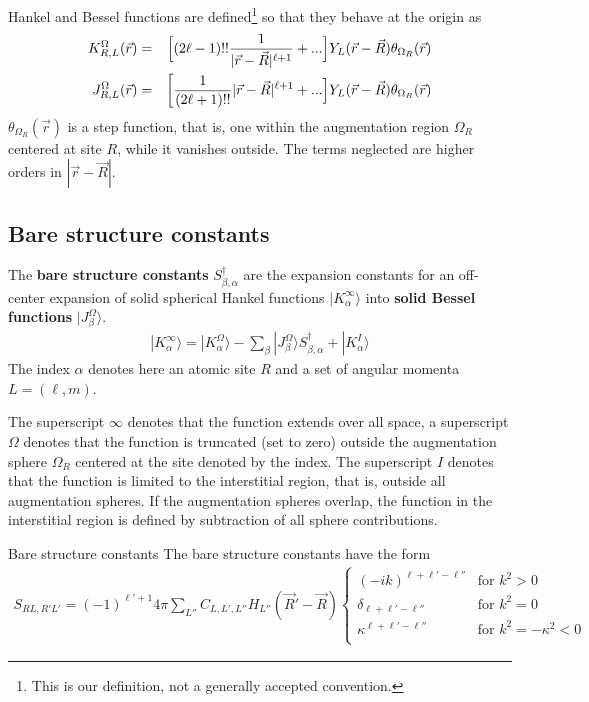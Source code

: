\documentclass[11pt,a4paper]{report}
\begin{document}
Hankel and Bessel functions are defined\footnote{This is our
  definition, not a generally accepted convention.} so that they
behave at the origin as
\begin{eqnarray}
K^\Omega_{R,L}(\vec{r})&=&
\Bigl[(2\ell-1)!! \frac{1}{|\vec{r}-\vec{R}|^{\ell+1}} 
+...\Bigr]
Y_L(\vec{r}-\vec{R})\theta_{\Omega_R}(\vec{r})
\\
J^\Omega_{R,L}(\vec{r})&=&
\biggl[\frac{1}{(2\ell+1)!!} |\vec{r}-\vec{R}|^{\ell+1} 
+...\Bigr]Y_L(\vec{r}-\vec{R})\theta_{\Omega_R}(\vec{r})
\end{eqnarray}
$\theta_{\Omega_R}(\vec{r})$ is a step function, that is, one within the
augmentation region $\Omega_R$ centered at site $R$, while it vanishes
outside. The terms neglected are higher orders in $|\vec{r}-\vec{R}|$.

\subsection{Bare structure constants}
The \textbf{bare structure constants}
$S^\dagger_{\beta,\alpha}$ are the expansion constants for an
off-center expansion of solid spherical Hankel functions $|K_{\alpha}^\infty\rangle$ into \textbf{solid Bessel
  functions} $|J^\Omega_{\beta}\rangle$.
\begin{eqnarray}
|K_{\alpha}^\infty\rangle=|K^\Omega_{\alpha}\rangle
-\sum_{\beta}|J^\Omega_{\beta}\rangle S^\dagger_{\beta,\alpha}
+|K^I_{\alpha}\rangle
\end{eqnarray}
The index $\alpha$ denotes here an atomic site $R$ and a set of
angular momenta $L=(\ell,m)$.

The superscript $\infty$ denotes that the function extends over all
space, a superscript $\Omega$ denotes that the function is truncated
(set to zero) outside the augmentation sphere $\Omega_{R}$ centered at
the site denoted by the index. The superscript $I$ denotes that the
function is limited to the interstitial region, that is, outside all
augmentation spheres. If the augmentation spheres overlap, the
function in the interstitial region is defined by subtraction of all
sphere contributions.



\begin{myshadowminipage}{Bare structure constants}
The bare structure constants have the form
\begin{eqnarray}
S_{RL,R'L'}=(-1)^{\ell'+1} 4\pi \sum_{L''} C_{L,L',L''} 
H_{L''}(\vec{R}'-\vec{R})
\begin{cases}
(-ik)^{\ell+\ell'-\ell''}&\text{for $k^2>0$}\\
\delta_{\ell+\ell'-\ell''}&\text{for $k^2=0$}\\
\kappa^{\ell+\ell'-\ell''}&\text{for $k^2=-\kappa^2<0$}\\
\end{cases}
\label{eq:fortmulaforbarestructureconstants}
\end{eqnarray}
\end{myshadowminipage}
\end{document}
